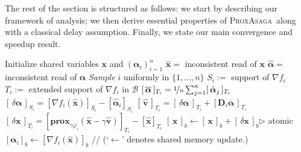 \documentclass{article}
\def\prox{{\mathbf{prox}}}
\newcommand{\PASAGA}{\textsc{ProxAsaga}}
\def\xx{{\boldsymbol x}}
\def\vv{{\boldsymbol v}}
\def\DD{{\boldsymbol D}}
\def\balpha{{\boldsymbol \alpha}}
\renewcommand{\llbracket}{[}
\renewcommand{\rrbracket}{]}
\begin{document}
The rest of the section is structured as follows:
we start by describing our framework of analysis;
we then derive essential properties of \PASAGA\ along with a classical delay assumption.
Finally, we state our main convergence and speedup result.

\begin{figure*}[ttt!]
 \begin{minipage}[t]{0.5\textwidth}
   \begin{algorithm}[H]
     \caption{\PASAGA\ (analyzed)}
     \label{alg:theoretical}
     \label{theoreticalgo}
     \begin{algorithmic}[1]
    \STATE Initialize shared variables $\xx$ and $({\boldsymbol\alpha}_i)_{i=1}^n$
    \LOOP
    \STATE $\hat \xx = $ inconsistent read of $\xx$
 	  \STATE $\hat {\boldsymbol\alpha} = $ inconsistent read of ${\boldsymbol\alpha}$
    	  \STATE \emph{Sample} $i$  uniformly in $\{1,...,n\}$
        \STATE $S_i :=$ support of $\nabla f_i$
        \STATE $T_i :=$ extended support of $\nabla f_i$ in $\mathcal{B}$
        \STATE $\llbracket\,\overline{{\boldsymbol\alpha}}\,\rrbracket_{T_i} = \nicefrac{1}{n} \sum_{j=1}^n \llbracket\,\hat{{\boldsymbol\alpha}}_j\,\rrbracket_{T_i}$
        \STATE $\llbracket\,\delta\balpha\,\rrbracket_{S_i} = \llbracket\nabla f_i(\hat \xx)\rrbracket_{S_i} - \llbracket\hat{{\boldsymbol\alpha}}_i\rrbracket_{S_i}$
        \STATE $\llbracket\,\hat \vv\,\rrbracket_{T_i} = \llbracket\,\delta\balpha\,\rrbracket_{T_i} + \llbracket\DD_i \overline {\boldsymbol\alpha}\,\rrbracket_{T_i}$
        \STATE $\llbracket\,\delta\xx\,\rrbracket_{T_i} = \llbracket\prox_{\gamma \varphi_i}(\hat{\xx} - \gamma \hat \vv)\rrbracket_{T_i} - \llbracket\hat\xx\rrbracket_{T_i}$
        \STATE $[\,\xx\,]_b \gets [\,\xx\,]_b + [\,\delta\xx\,]_b$\hfill$\triangleright$ atomic \label{alg1:atomicLine}
        \STATE $[{\boldsymbol\alpha}_i]_b \gets [\nabla f_i(\hat{\xx})]_b$
        \ENDIF
        \ENDFOR
        \ENDFOR
        \STATE // {\footnotesize(`$\gets$' denotes shared memory update.)}
    \ENDLOOP
   \end{algorithmic}
    \end{algorithm}
 \end{minipage}
 \hfill
 \begin{minipage}[t]{0.5\textwidth}
    \begin{algorithm}[H]
      \caption{\PASAGA\ (implemented)}
      \label{alg:sagasync}
      \begin{algorithmic}[1]

\end{algorithmic}
\end{algorithm}
\end{minipage}
\end{figure*}
\end{document}
